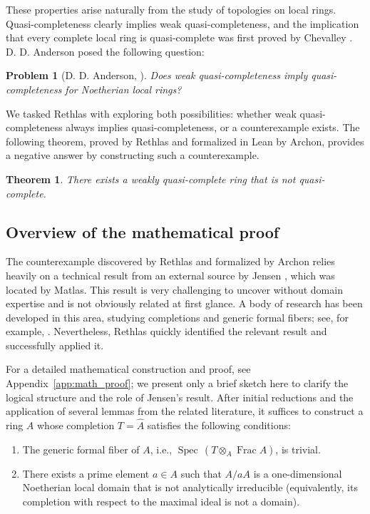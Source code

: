 \documentclass[]{pkuai4m}
\theoremstyle{plain}
\newtheorem{theorem}{Theorem}
\newtheorem*{problem*}{Problem}
\theoremstyle{definition}
\begin{document}
These properties arise naturally from the study of topologies on local rings. Quasi-completeness clearly implies weak quasi-completeness, and the implication that every complete local ring is quasi-complete was first proved by Chevalley \cite[Lemma 7]{chevalley1943theory}. D. D. Anderson posed the following question:

\begin{problem*}[{D. D. Anderson, \cite[Problem 8a]{cahen2014open}}]
Does weak quasi-completeness imply quasi-completeness for Noetherian local rings?
\end{problem*}

We tasked Rethlas with exploring both possibilities: whether weak quasi-completeness always implies quasi-completeness, or a counterexample exists. The following theorem, proved by Rethlas and formalized in Lean by Archon, provides a negative answer by constructing such a counterexample.

\begin{theorem}\label{thm:main}
    There exists a weakly quasi-complete ring that is not quasi-complete.
\end{theorem}

\subsection{Overview of the mathematical proof}\label{subsec:nl_proof_sketch}


The counterexample discovered by Rethlas and formalized by Archon relies heavily on a technical result from an external source by Jensen \cite{jensen2006completions}, which was located by Matlas. This result is very challenging to uncover without domain expertise and is not obviously related at first glance. A body of research has been developed in this area, studying completions and generic formal fibers; see, for example, \cite{heitmann1993characterization, loepp1997constructing, jensen2006completions, fleming2019completely}. Nevertheless, Rethlas quickly identified the relevant result and successfully applied it.

For a detailed mathematical construction and proof, see Appendix~\ref{app:math_proof}; we present only a brief sketch here to clarify the logical structure and the role of Jensen's result. After initial reductions and the application of several lemmas from the related literature, it suffices to construct a ring \(A\) whose completion \(T = \widehat A\) satisfies the following conditions:
\begin{enumerate}[leftmargin=*]
\item[A.] The generic formal fiber of \(A\), i.e., \(\operatorname{Spec}\, (T \otimes_{A} \operatorname{Frac} A)\), is trivial.
\item[B.] There exists a prime element \(a \in A\) such that \(A/aA\) is a one-dimensional Noetherian local domain that is not analytically irreducible (equivalently, its completion with respect to the maximal ideal is not a domain).
\end{enumerate}
\end{document}
